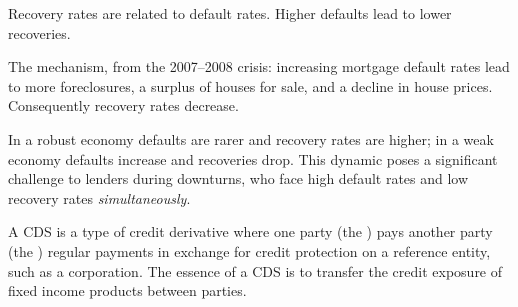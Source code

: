 \begin{crkeybox}
Recovery rates are  related to default rates. Higher defaults lead
to lower recoveries.

\smallskip
The mechanism, from the 2007--2008 crisis: increasing mortgage default rates lead
to more foreclosures, a surplus of houses for sale, and a decline in house
prices. Consequently recovery rates decrease.

\smallskip
In a robust economy defaults are rarer and recovery rates are higher; in a weak
economy defaults increase and recoveries drop. This dynamic poses a significant
challenge to lenders during downturns, who face high default rates and low
recovery rates \emph{simultaneously}.
\end{crkeybox}


\begin{crdefbox}
A CDS is a type of credit derivative where one party (the ) pays another party (the ) regular payments in
exchange for credit protection on a reference entity, such as a corporation. The
essence of a CDS is to transfer the credit exposure of fixed income products
between parties.
\end{crdefbox}

